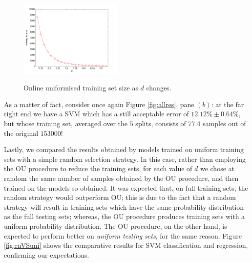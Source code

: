 \begin{figure}[!ht] \centering
  \includegraphics[width=0.45\textwidth]{figs/fig_allSize} \\
  \caption{Online uniformised training set size as $d$ changes.}
  \label{fig:TSsize}
\end{figure}

As a matter of fact, consider once again Figure \ref{fig:allres}, pane
$(b)$: at the far right end we have a SVM which has a still acceptable
error of $12.12\% \pm 0.64\%$, but whose training set, averaged over
the $5$ splits, consists of $77.4$ samples out of the original
$153000$!

Lastly, we compared the results obtained by models trained on uniform
training sets with a simple random selection strategy. In this case,
rather than employing the OU procedure to reduce the training sets,
for each value of $d$ we chose at random the same number of samples
obtained by the OU procedure, and then trained on the models so
obtained. It was expected that, on full training sets, the random
strategy would outperform OU; this is due to the fact that a random
strategy will result in training sets which have the same probability
distribution as the full testing sets; whereas, the OU procedure
produces training sets with a uniform probability distribution. The OU
procedure, on the other hand, is expected to perform better on
\emph{uniform testing sets}, for the same reason. Figure
\ref{fig:rnVSuni} shows the comparative results for SVM classification
and regression, confirming our expectations.

